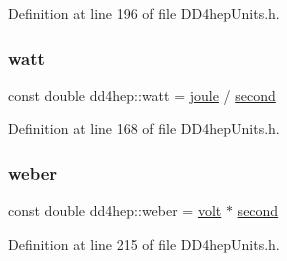 Definition at line 196 of file D\+D4hep\+Units.\+h.

\hypertarget{namespacedd4hep_ac7c4e7152ccb61b9950932bb06c7c4cd}{}\label{namespacedd4hep_ac7c4e7152ccb61b9950932bb06c7c4cd} 
\subsubsection{\texorpdfstring{watt}{watt}}
{\footnotesize\ttfamily const double dd4hep\+::watt = \hyperlink{namespacedd4hep_a8cdc11c61e5f953baede59569544a324}{joule} / \hyperlink{namespacedd4hep_ac03364576705a245265d8ed6ea26b871}{second}\hspace{0.3cm}{\ttfamily [static]}}



Definition at line 168 of file D\+D4hep\+Units.\+h.

\hypertarget{namespacedd4hep_abf1c21ae96759cd276d59ddde4819838}{}\label{namespacedd4hep_abf1c21ae96759cd276d59ddde4819838} 
\subsubsection{\texorpdfstring{weber}{weber}}
{\footnotesize\ttfamily const double dd4hep\+::weber = \hyperlink{namespacedd4hep_a1bbac6ed4a69b41427c9a44a513e2500}{volt} $\ast$ \hyperlink{namespacedd4hep_ac03364576705a245265d8ed6ea26b871}{second}\hspace{0.3cm}{\ttfamily [static]}}



Definition at line 215 of file D\+D4hep\+Units.\+h.

